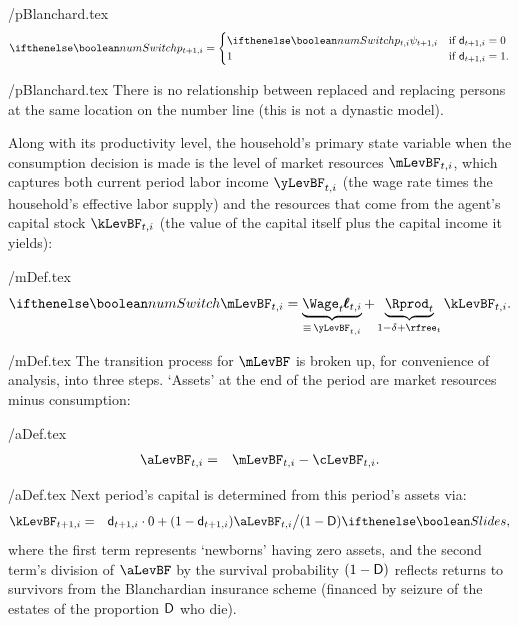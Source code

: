 \begin{verbatimwrite}{\eq/pBlanchard.tex}
  \begin{equation*} \ifnumSw
    {p}_{t+1,i} =
    \begin{cases}
      \ifnumSw  {p}_{t,i} \psi_{t+1,i} & \text{if } \pDies_{t+1,i} = 0 \\
      1 & \text{if } \pDies_{t+1,i} = 1. \\
    \end{cases}
  \end{equation*}
\end{verbatimwrite}
 \eq/pBlanchard.tex
There is no relationship between replaced and replacing persons at the same location on the number line (this is not a dynastic model).


Along with its productivity level, the household's primary state variable when the consumption decision is made is the level of market resources $\mLevBF_{t,i}$, which captures both current period labor income $\yLevBF_{t,i}$ (the wage rate times the household's effective labor supply) and the resources that come from the agent's capital stock $\kLevBF_{t,i}$ (the value of the capital itself plus the capital income it yields):
\begin{verbatimwrite}{\eq/mDef.tex}
  \begin{equation}
    \ifnumSw \mLevBF_{t,i} = \underbrace{{\bf \Wage}_{t} \pmb{\ell}_{t,i}}_{\equiv\,\yLevBF_{t,i}} + \underbrace{{\Rprod}_t}_{1-\delta+\rfree_{t}} \kLevBF_{t,i}.
    \label{eq:mDef}
  \end{equation}
\end{verbatimwrite}
 \eq/mDef.tex
The transition process for $\mLevBF$ is broken up, for convenience
of analysis, into three steps.  `Assets' at the end of the period are
market resources minus consumption:
\begin{verbatimwrite}{\eq/aDef.tex}
  \begin{eqnarray}
    \aLevBF_{t,i} & = & \mLevBF_{t,i}-\cLevBF_{t,i}. \label{eq:aDef}
  \end{eqnarray}
\end{verbatimwrite}
 \eq/aDef.tex
Next period's capital is determined from this period's assets via:
\begin{eqnarray}
  \kLevBF_{t+1,i} & = & \pDies_{t+1,i} \cdot 0+ (1-\pDies_{t+1,i})\aLevBF_{t,i} \big/\PLives \label{eq:ktp1icompact}
                        \ifslides{}{,}
\end{eqnarray}
where the first term represents `newborns' having zero assets, and the second term's division of $\aLevBF$ by the survival probability $(1-\mathsf{D})$ reflects returns to survivors from the Blanchardian insurance scheme (financed by seizure of the estates of the proportion $\mathsf{D}$ who die).


